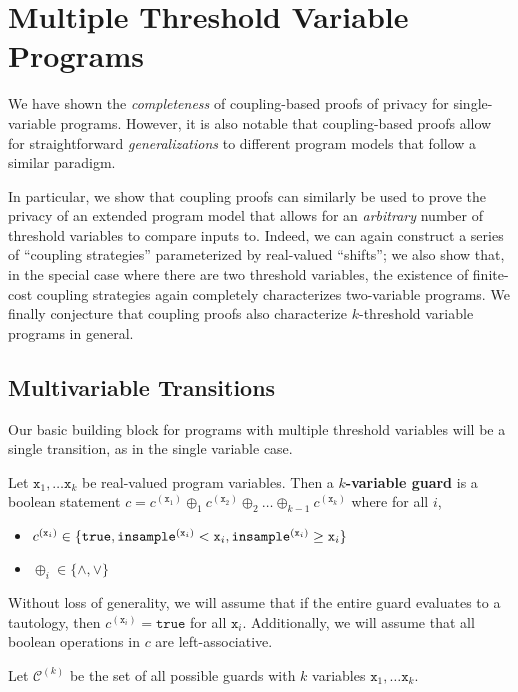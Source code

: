 
\section{Multiple Threshold Variable Programs}

We have shown the \textit{completeness} of coupling-based proofs of privacy for single-variable programs. However, it is also notable that coupling-based proofs allow for straightforward \textit{generalizations} to different program models that follow a similar paradigm. 

In particular, we show that coupling proofs can similarly be used to prove the privacy of an extended program model that allows for an \textit{arbitrary} number of threshold variables to compare inputs to. Indeed, we can again construct a series of ``coupling strategies'' parameterized by real-valued ``shifts''; we also show that, in the special case where there are two threshold variables, the existence of finite-cost coupling strategies again completely characterizes two-variable programs.
We finally conjecture that coupling proofs also characterize $k$-threshold variable programs in general. 

\subsection{Multivariable Transitions}

Our basic building block for programs with multiple threshold variables will be a single transition, as in the single variable case. 

\begin{defn}
    Let $\texttt{x}_1, \ldots \texttt{x}_k$ be real-valued program variables. Then a \textbf{$k$-variable guard} is a boolean statement $c = c^{(\texttt{x}_1)}\oplus_1 c^{(\texttt{x}_2)}\oplus_2\ldots\oplus_{k-1}c^{(\texttt{x}_k)}$ where for all $i$, \begin{itemize}
        \item $c^{(\texttt{x}_i)}\in \{\texttt{true}, \mvlguard[\texttt{x}_i], \mvgguard[\texttt{x}_i]\}$
        \item $\oplus_i \in \{\land, \lor\}$
    \end{itemize}
    Without loss of generality, we will assume that if the entire guard evaluates to a tautology, then $c^{(\texttt{x}_i)}=\texttt{true}$ for all $\texttt{x}_i$. Additionally, we will assume that all boolean operations in $c$ are left-associative. 
    
    

    Let $\mathcal{C}^{(k)}$ be the set of all possible guards with $k$ variables $\texttt{x}_1, \ldots \texttt{x}_k$.
\end{defn}

